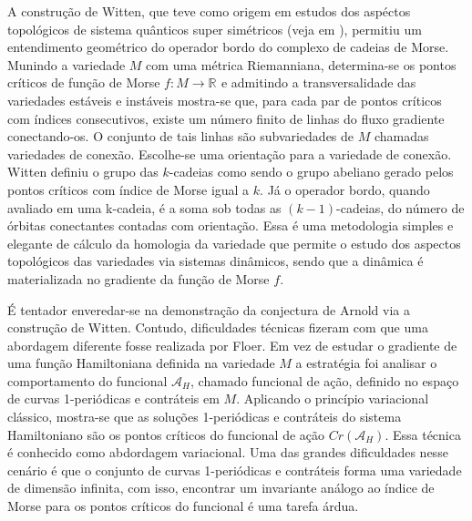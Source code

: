 \documentclass[12pt]{book}
\newcommand{\funcionalH}{\mathcal{A}_{H}}
\newcommand{\pontoscriticos}[1]{\textit{Cr}(#1)}
\newcommand{\real}[1]{\mathbb{R}^{#1}}
\newcommand{\reta}{\real{}}
\begin{document}
	A construção de Witten, que teve como origem em estudos dos aspéctos topológicos de sistema quânticos super simétricos (veja em \cite{witten_supersymmetry_morse}), permitiu um entendimento geométrico do operador bordo do complexo de cadeias de Morse. Munindo a variedade $M$ com uma métrica Riemanniana, determina-se os pontos críticos de função de Morse $f: M \to \reta$ e admitindo a transversalidade das variedades estáveis e instáveis mostra-se que, para cada par de pontos críticos com índices consecutivos, existe um número finito de linhas do fluxo gradiente conectando-os. O conjunto de tais linhas são subvariedades de $M$ chamadas variedades de conexão. Escolhe-se uma orientação para a variedade de conexão. Witten definiu o grupo das $k$-cadeias como sendo o grupo abeliano gerado pelos pontos críticos com índice de Morse igual a $k$. Já o operador bordo, quando avaliado em uma k-cadeia, é a soma sob todas as $(k-1)$-cadeias, do número de órbitas conectantes contadas com orientação. Essa é uma metodologia simples e elegante de cálculo da homologia da variedade que permite o estudo dos aspectos topológicos das variedades via sistemas dinâmicos, sendo que a dinâmica é materializada no gradiente da função de Morse $f$.
	
	É tentador enveredar-se na demonstração da conjectura de Arnold via a construção de Witten. Contudo, dificuldades técnicas fizeram com que uma abordagem diferente fosse realizada por Floer. Em vez de estudar o gradiente de uma função Hamiltoniana definida na variedade $M$ a estratégia foi analisar o comportamento do funcional $\funcionalH$, chamado funcional de ação, definido no espaço de curvas 1-periódicas e contráteis em $M$. Aplicando o princípio variacional clássico, mostra-se que as soluções 1-periódicas e contráteis do sistema Hamiltoniano são os pontos críticos do funcional de ação $\pontoscriticos{\funcionalH}$. Essa técnica é conhecido como abdordagem variacional. Uma das grandes dificuldades nesse cenário é que o conjunto de curvas 1-periódicas e contráteis forma uma variedade de dimensão infinita, com isso, encontrar um invariante análogo ao índice de Morse para os pontos críticos do funcional é uma tarefa árdua.
	
\end{document}
